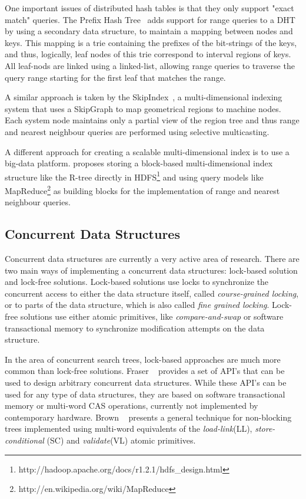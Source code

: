 \documentclass[11pt,a4paper]{globis-book}
\begin{document}
One important issues of distributed hash tables is that they only support "exact match" queries. The Prefix Hash Tree~\cite{Ramabhadran04prefixhash} adds support for range queries to a DHT by using a secondary data structure, to maintain a mapping between nodes and keys. This mapping is a trie containing the prefixes of the bit-strings of the keys, and thus, logically, leaf nodes of this trie correspond to interval regions of keys. All leaf-nods are linked using a linked-list, allowing range queries to traverse the query range starting for the first leaf that matches the range. 

A similar approach is taken by the SkipIndex~\cite{Zhang04skipindex}, a multi-dimensional indexing system that uses a SkipGraph to map geometrical regions to machine nodes. Each system node maintains only a partial view of the region tree and thus range and nearest neighbour queries are performed using selective multicasting.

A different approach for creating a scalable multi-dimensional index is to use a big-data platform. \cite{Liao2010HadoopIndex} proposes storing a block-based multi-dimensional index structure like the R-tree directly in HDFS\footnote{http://hadoop.apache.org/docs/r1.2.1/hdfs\_design.html} and using query models like MapReduce\footnote{http://en.wikipedia.org/wiki/MapReduce} as building blocks for the implementation of range and nearest neighbour queries.

\subsection{Concurrent Data Structures}

Concurrent data structures are currently a very active area of research. There are two main ways of implementing a concurrent data structures: lock-based solution and lock-free solutions. Lock-based solutions use locks to synchronize the concurrent access to either the data structure itself, called \textit{course-grained locking}, or to parts of the data structure, which is also called \textit{fine grained locking}. Lock-free solutions use either atomic primitives, like \textit{compare-and-swap} or software transactional memory to synchronize modification attempts on the data structure.

In the area of concurrent search trees, lock-based approaches are much more common than lock-free solutions. Fraser ~\cite{Fraser2007concurrent} provides a set of API's that can be used to design arbitrary concurrent data structures. While these API's can be used for any type of data structures, they are based on software transactional memory or multi-word CAS operations, currently not implemented by contemporary hardware. Brown ~\cite{Brown2014concurrent} presents a general technique for non-blocking trees implemented using multi-word equivalents of the \textit{load-link}(LL), \textit{store-conditional} (SC) and \textit{validate}(VL) atomic primitives.
\end{document}

